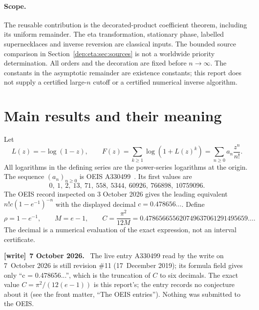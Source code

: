 \documentclass[11pt]{article}
\theoremstyle{definition}\newtheorem{definition}[theorem]{Definition}
\theoremstyle{remark}\newtheorem{remark}[theorem]{Remark}
\newenvironment{writenote}[1][]{\par\smallskip\begingroup\small
 \noindent\textbf{[write]}\if\relax\detokenize{#1}\relax\else~\textbf{#1.}\fi\ }%
 {\par\endgroup\smallskip}
\begin{document}
\paragraph{Scope.}
The reusable contribution is the decorated-product coefficient theorem,
including its uniform remainder. The eta transformation, stationary
phase, labelled supernecklaces and inverse reversion are classical
inputs. The bounded source comparison in Section~\ref{dep:eta:sec:sources} is
not a worldwide priority determination. All orders and the decoration
are fixed before $n\to\infty$. The constants in the asymptotic remainder
are existence constants; this report does not supply a certified
large-$n$ cutoff or a certified numerical inverse algorithm.

\section{Main results and their meaning}\label{dep:eta:sec:main}
Let
\begin{equation}\label{dep:eta:eq:model}
 L(z)=-\log(1-z),\qquad
 F(z)=\sum_{k\ge1}\log(1+L(z)^k)
     =\sum_{n\ge0}a_n\frac{z^n}{n!}.
\end{equation}
All logarithms in the defining series are the power-series logarithms
at the origin. The sequence $(a_n)_{n\ge0}$ is OEIS A330499~\cite{oeisA330499}.
Its first values are
\[
 0,\ 1,\ 2,\ 13,\ 71,\ 558,\ 5344,\ 60926,\ 766898,\ 10759096.
\]
The OEIS record inspected on 3 October 2026 gives the leading equivalent
$n!c(1-e^{-1})^{-n}$ with the displayed decimal $c=0.478656\ldots$.
Define
\begin{equation}\label{dep:eta:eq:logconstants}
 \rho=1-e^{-1},\qquad M=e-1,\qquad C=\frac{\pi^2}{12M}
       =0.478656655620749637061291495659\ldots.
\end{equation}
The decimal is a numerical evaluation of the exact expression, not an
interval certificate.

\begin{writenote}[7 October 2026]
The live entry A330499 read by the write on 7~October 2026 is still revision \#11 (17~December 2019); its formula field gives only ``c = 0.478656...'', which is the truncation of $C$ to six decimals. The exact value $C=\pi^2/(12(e-1))$ is this report's; the entry records no conjecture about it (see the front matter, ``The OEIS entries''). Nothing was submitted to the OEIS.
\end{writenote}
\end{document}
